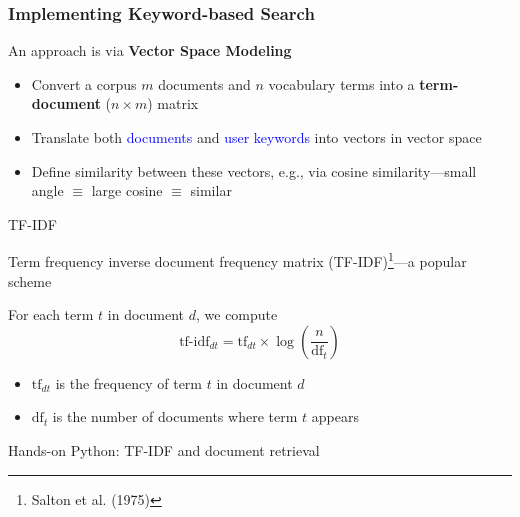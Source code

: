 \documentclass[compress,mathserif,t]{beamer} %
\begin{document}
\begin{frame}
	\frametitle{Implementing Keyword-based 
	Search} 
	
	An approach is via \textbf{Vector Space 
	Modeling}
	\begin{itemize}
		\item Convert a corpus $m$ 
		documents 
		and $n$ vocabulary terms 
		into a 
		\textbf{term-document} ($n 
		\times m$) 
		matrix
		
		\item Translate both 
		\textcolor{blue}{documents} and 
		\textcolor{blue}{user keywords} 
		into vectors in vector space
		
		\item Define similarity between these 
		vectors, e.g., via cosine 
		similarity---small angle $\equiv$ 
		large cosine $\equiv$ similar 
		
	\end{itemize}
	
\end{frame}

\begin{frame}{TF-IDF} 
	
	Term frequency inverse document frequency 
	matrix (TF-IDF)\footnote{Salton et al. 
	(1975)}---a popular scheme
	
	\vspace{1cm}
	
	For each term $t$ in document $d$, we 
	compute 
	\[ \text{tf-idf}_{dt}  = \text{tf}_{dt} 
	\times \log  \left ( 
	\frac{n}{\text{df}_{t}} \right )  \]
	\begin{itemize}
		\item $\text{tf}_{dt}$ is the 
		frequency of term $t$ in document $d$
		\item $\text{df}_{t}$ is the number of 
		documents where term $t$ 
		appears
	\end{itemize}
	
	
\end{frame}


\begin{frame}[plain,c]
	
	\begin{center}
		
		Hands-on Python: TF-IDF and 
		document retrieval 
		
	\end{center}
	
\end{frame}
\end{document}
